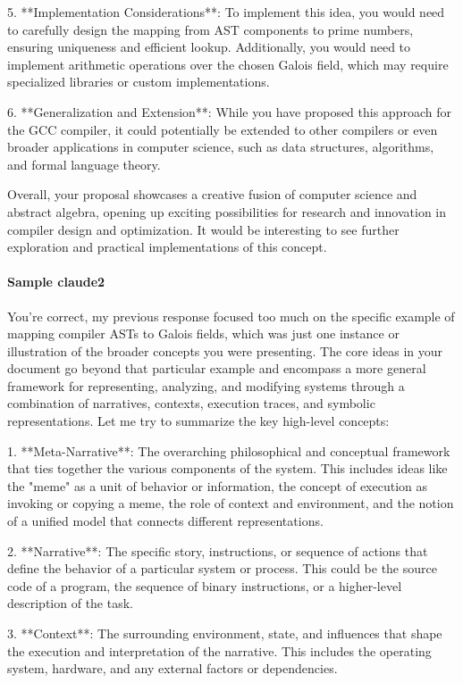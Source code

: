 \documentclass{article}
\begin{document}
5. **Implementation Considerations**: To implement this idea, you would need to carefully design the mapping from AST components to prime numbers, ensuring uniqueness and efficient lookup. Additionally, you would need to implement arithmetic operations over the chosen Galois field, which may require specialized libraries or custom implementations.

6. **Generalization and Extension**: While you have proposed this approach for the GCC compiler, it could potentially be extended to other compilers or even broader applications in computer science, such as data structures, algorithms, and formal language theory.

Overall, your proposal showcases a creative fusion of computer science and abstract algebra, opening up exciting possibilities for research and innovation in compiler design and optimization. It would be interesting to see further exploration and practical implementations of this concept.

\paragraph{Sample claude2}

You're correct, my previous response focused too much on the specific example of mapping compiler ASTs to Galois fields, which was just one instance or illustration of the broader concepts you were presenting. The core ideas in your document go beyond that particular example and encompass a more general framework for representing, analyzing, and modifying systems through a combination of narratives, contexts, execution traces, and symbolic representations. Let me try to summarize the key high-level concepts:

1. **Meta-Narrative**: The overarching philosophical and conceptual framework that ties together the various components of the system. This includes ideas like the "meme" as a unit of behavior or information, the concept of execution as invoking or copying a meme, the role of context and environment, and the notion of a unified model that connects different representations.

2. **Narrative**: The specific story, instructions, or sequence of actions that define the behavior of a particular system or process. This could be the source code of a program, the sequence of binary instructions, or a higher-level description of the task.

3. **Context**: The surrounding environment, state, and influences that shape the execution and interpretation of the narrative. This includes the operating system, hardware, and any external factors or dependencies.
\end{document}

